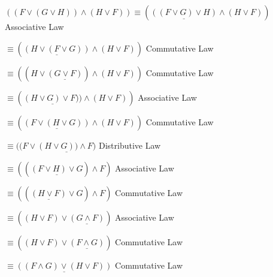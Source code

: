 \documentclass{article} %
\begin{document}
\begin{flushleft}
\hspace{2cm}$((F\lor(G\lor H)) \land (H\lor F)) \equiv (\underline{((F\lor G)\lor H)} \land (H\lor F))$ \hspace{2cm} Associative Law

\hspace{6.2cm}$\equiv (\underline{(H\lor (F\lor G))} \land (H\lor F))$ \hspace{2cm} Commutative Law

\hspace{6.2cm}$\equiv ((H\lor \underline{(G\lor F)}) \land (H\lor F))$ \hspace{2cm} Commutative Law

\hspace{6.2cm}$\equiv (\underline{(H\lor G)\lor F))} \land (H\lor F))$ \hspace{2cm} Associative Law

\hspace{6.2cm}$\equiv (\underline{(F\lor (H\lor G))} \land (H\lor F))$ \hspace{2cm} Commutative Law

\hspace{6.2cm}$\equiv ((F\lor \underline{(H\lor G)) \land F)}$ \hspace{3cm} Distributive Law

\hspace{6.2cm}$\equiv ((\underline{(F\lor H)\lor G}) \land F)$ \hspace{3cm} Associative Law

\hspace{6.2cm}$\equiv ((\underline{(H\lor F)}\lor G) \land F)$ \hspace{3cm} Commutative Law

\hspace{6.2cm}$\equiv ((H\lor F)\lor \underline{(G\land F)})$ \hspace{3cm} Associative Law

\hspace{6.2cm}$\equiv ((H\lor F)\lor \underline{(F\land G)})$ \hspace{3cm} Commutative Law

\hspace{6.2cm}$\equiv \underline{((F\land G)\lor (H\lor F))}$ \hspace{3cm} Commutative Law

\end{flushleft}

\newpage
\end{document}
